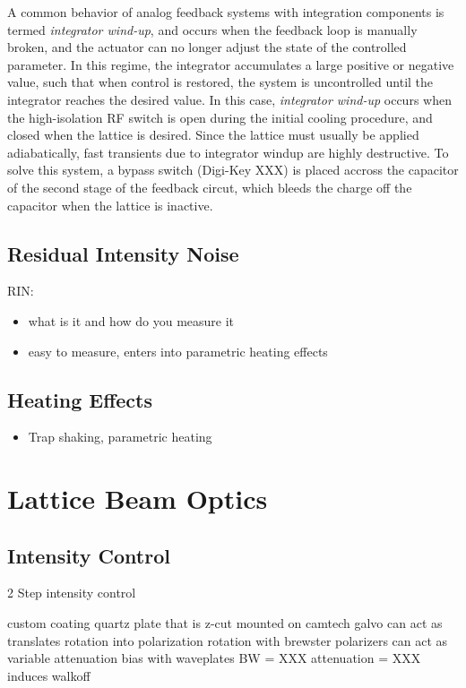 \documentclass[twocolumn,aps,pra,showpacs,preprintnumbers,bibnotes]{revtex4-1}
\begin{document}
A common behavior of analog feedback systems with integration components is termed \textit{integrator wind-up}, and occurs when the feedback loop is manually broken, and the actuator can no longer adjust the state of the controlled parameter. 
In this regime, the integrator accumulates a large positive or negative value, such that when control is restored, the system is uncontrolled until the integrator reaches the desired value.
In this case, \textit{integrator wind-up} occurs when the high-isolation RF switch is open during the initial cooling procedure, and closed when the lattice is desired. 
Since the lattice must usually be applied adiabatically, fast transients due to integrator windup are highly destructive.
To solve this system, a bypass switch (Digi-Key XXX) is placed accross the capacitor of the second stage of the feedback circut, which bleeds the charge off the capacitor when the lattice is inactive.


\subsection{Residual Intensity Noise}
RIN:
\begin{itemize}
\item what is it and how do you measure it
\item easy to measure, enters into parametric heating effects
\end{itemize}

\subsection{Heating Effects}
\begin{itemize}
	\item Trap shaking, parametric heating
\end{itemize}

\section{Lattice Beam Optics}


\subsection{Intensity Control}

2 Step intensity control

custom coating quartz plate that is z-cut mounted on camtech galvo
can act as translates rotation into polarization rotation
with brewster polarizers can act as variable attenuation
bias with waveplates
BW = XXX
attenuation = XXX
induces walkoff
\end{document}
